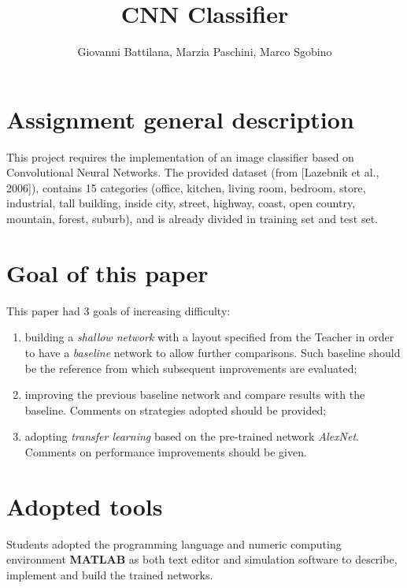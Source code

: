 \documentclass[a4paper, 11pt]{article} %
\begin{document}


\title{CNN Classifier}
\author{Giovanni Battilana, Marzia Paschini, Marco Sgobino}
\maketitle
\tableofcontents %

\section{Assignment general description}

This project requires the implementation of an image classifier based on Convolutional Neural Networks. The provided dataset (from [Lazebnik et al., 2006]), contains 15 categories (office, kitchen, living room, bedroom, store, industrial, tall building, inside city, street, highway, coast, open country, mountain, forest, suburb), and is already divided in training set and test set.


\section{Goal of this paper}

This paper had 3 goals of increasing difficulty:

\begin{enumerate}
    \item building a \emph{shallow network} with a layout specified from the Teacher in order to have a \emph{baseline} network to allow further comparisons. Such baseline should be the reference from which subsequent improvements are evaluated;
    \item improving the previous baseline network and compare results with the baseline. Comments on strategies adopted should be provided;
    \item adopting \emph{transfer learning} based on the pre-trained network \emph{AlexNet}. Comments on performance improvements should be given.
\end{enumerate}

\section{Adopted tools}

Students adopted the programming language and numeric computing environment \textbf{MATLAB} as both text editor and simulation software to describe, implement and build the trained networks. 
\end{document}
